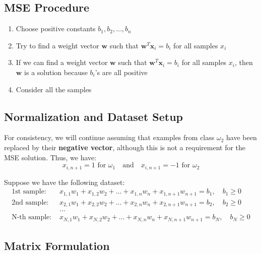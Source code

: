 \documentclass[11pt,a4paper]{article}
\theoremstyle{definition}
\theoremstyle{plain}
\theoremstyle{remark}
\begin{document}
\subsection{MSE Procedure}

\begin{tcolorbox}[colback=purple!5!white,colframe=purple!75!black,title=\textbf{MSE Procedure}]
\begin{enumerate}
    \item Choose positive constants $b_1, b_2, \ldots, b_n$
    
    \item Try to find a weight vector $\mathbf{w}$ such that $\mathbf{w}^T \mathbf{x}_i = b_i$ for all samples $x_i$
    
    \item If we can find a weight vector $\mathbf{w}$ such that $\mathbf{w}^T \mathbf{x}_i = b_i$ for all samples $x_i$, then $\mathbf{w}$ is a solution because $b_i$'s are all positive
    
    \item Consider all the samples
\end{enumerate}
\end{tcolorbox}

\subsection{Normalization and Dataset Setup}

For consistency, we will continue assuming that examples from class $\omega_2$ have been replaced by their \textbf{negative vector}, although this is not a requirement for the MSE solution. Thus, we have:
\[
x_{i,n+1} = 1 \text{ for } \omega_1 \quad \text{and} \quad x_{i,n+1} = -1 \text{ for } \omega_2
\]

Suppose we have the following dataset:
\begin{align*}
\text{1st sample: } & x_{1,1}w_1 + x_{1,2}w_2 + \ldots + x_{1,n}w_n + x_{1,n+1}w_{n+1} = b_1, \quad b_1 \geq 0 \\
\text{2nd sample: } & x_{2,1}w_1 + x_{2,2}w_2 + \ldots + x_{2,n}w_n + x_{2,n+1}w_{n+1} = b_2, \quad b_2 \geq 0 \\
& \ldots \\
\text{N-th sample: } & x_{N,1}w_1 + x_{N,2}w_2 + \ldots + x_{N,n}w_n + x_{N,n+1}w_{n+1} = b_N, \quad b_N \geq 0
\end{align*}

\subsection{Matrix Formulation}
\end{document}
